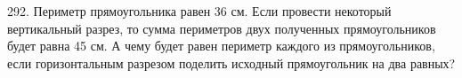 292. Периметр прямоугольника равен 36 см. Если провести некоторый вертикальный разрез, то сумма периметров двух полученных прямоугольников будет равна 45 см. А чему будет равен периметр каждого из прямоугольников, если горизонтальным разрезом поделить исходный прямоугольник на два равных?\\
